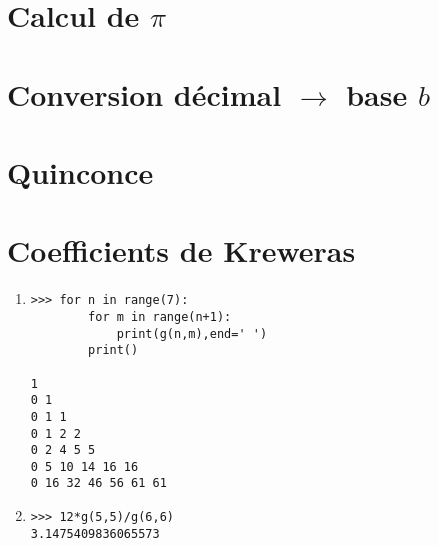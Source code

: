 \documentclass[11pt,a4paper]{article}
\begin{document}
\entete

\section{Calcul de $\pi$}


\section{Conversion décimal $\rightarrow$ base $b$}


\section{Quinconce}


\section{Coefficients de Kreweras}
%

\begin{minipage}[t]{7cm}
\begin{enumerate}
\item 
\begin{Verbatim}
>>> for n in range(7):
        for m in range(n+1):
            print(g(n,m),end=' ')
        print()

1 
0 1 
0 1 1 
0 1 2 2 
0 2 4 5 5 
0 5 10 14 16 16 
0 16 32 46 56 61 61 
\end{Verbatim}
\end{enumerate}
\end{minipage}
\hfill
\begin{minipage}[t]{7cm}
\begin{enumerate}\setcounter{enumi}{1}
\item  
\begin{Verbatim}
>>> 12*g(5,5)/g(6,6)
3.1475409836065573

\end{Verbatim}
\end{enumerate}
\end{minipage}
\end{document}
